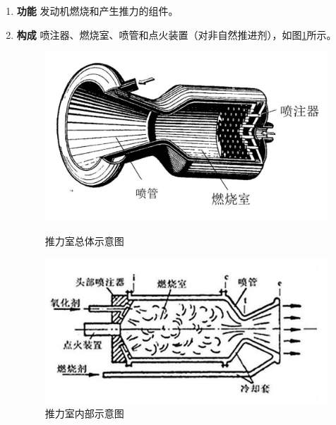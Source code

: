 \sssection[推力室组件]
\vspace*{-1em}
\begin{enumerate}[\hspace*{1.5em} (1) ]
	\item \textbf{功能} \hspace*{1em} 发动机燃烧和产生推力的组件。\vspace*{-0.8em}
	\item \textbf{构成} \hspace*{1em} 喷注器、燃烧室、喷管和点火装置（对非自然推进剂），如图\ref{推力室}所示。
	\begin{figure}[!htb]
		\centering
		\begin{minipage}{0.4\linewidth}
			\centering
			\includegraphics[width=\linewidth]{pic/推力室.jpg}
			\vspace*{-3em}
			\caption{推力室总体示意图}
			\label{推力室}
		\end{minipage}
		\begin{minipage}{0.45\linewidth}
			\centering
			\includegraphics[width=\linewidth]{pic/推力室2.jpg}
			\vspace*{-2.8em}
			\caption{推力室内部示意图}

\end{minipage}
\end{figure}
\end{enumerate}
